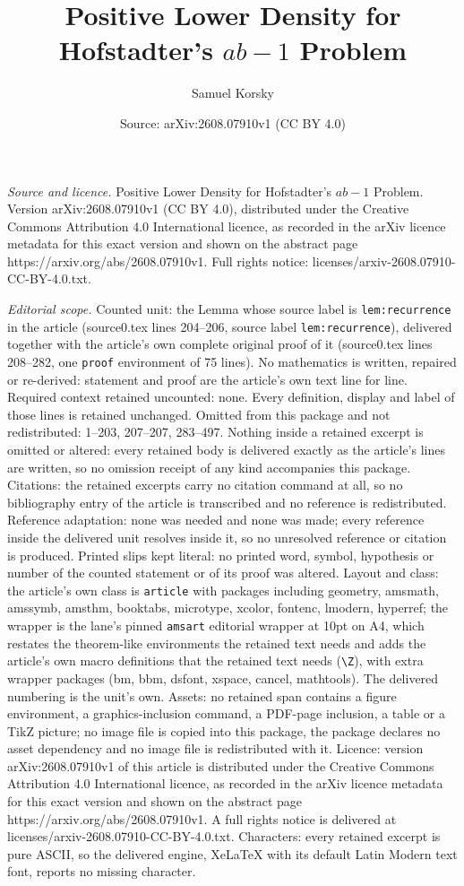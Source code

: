 \documentclass[10pt,a4paper]{amsart}
\title[Positive Lower Density for Hofstadter's $ab-1$ Problem]{Positive Lower Density for Hofstadter's $ab-1$ Problem}
\author{Samuel Korsky}
\date{Source: arXiv:2608.07910v1 (CC BY 4.0)}
\begin{document}
\maketitle

\noindent\emph{Source and licence.} Positive Lower Density for Hofstadter's $ab-1$ Problem. Version arXiv:2608.07910v1 (CC BY 4.0), distributed under the Creative Commons Attribution 4.0 International licence, as recorded in the arXiv licence metadata for this exact version and shown on the abstract page https://arxiv.org/abs/2608.07910v1. Full rights notice: licenses/arxiv-2608.07910-CC-BY-4.0.txt.\par\smallskip

\noindent\textit{Editorial scope.} Counted unit: the Lemma whose source label is \texttt{lem:recurrence} in the article (source0.tex lines 204--206, source label \texttt{lem:recurrence}), delivered together with the article's own complete original proof of it (source0.tex lines 208--282, one \texttt{proof} environment of 75 lines). No mathematics is written, repaired or re-derived: statement and proof are the article's own text line for line. Required context retained uncounted: none. Every definition, display and label of those lines is retained unchanged. Omitted from this package and not redistributed: 1--203, 207--207, 283--497. Nothing inside a retained excerpt is omitted or altered: every retained body is delivered exactly as the article's lines are written, so no omission receipt of any kind accompanies this package. Citations: the retained excerpts carry no citation command at all, so no bibliography entry of the article is transcribed and no reference is redistributed. Reference adaptation: none was needed and none was made; every reference inside the delivered unit resolves inside it, so no unresolved reference or citation is produced. Printed slips kept literal: no printed word, symbol, hypothesis or number of the counted statement or of its proof was altered. Layout and class: the article's own class is \texttt{article} with packages including geometry, amsmath, amssymb, amsthm, booktabs, microtype, xcolor, fontenc, lmodern, hyperref; the wrapper is the lane's pinned \texttt{amsart} editorial wrapper at 10pt on A4, which restates the theorem-like environments the retained text needs and adds the article's own macro definitions that the retained text needs (\texttt{\textbackslash Z}), with extra wrapper packages (bm, bbm, dsfont, xspace, cancel, mathtools). The delivered numbering is the unit's own. Assets: no retained span contains a figure environment, a graphics-inclusion command, a PDF-page inclusion, a table or a TikZ picture; no image file is copied into this package, the package declares no asset dependency and no image file is redistributed with it. Licence: version arXiv:2608.07910v1 of this article is distributed under the Creative Commons Attribution 4.0 International licence, as recorded in the arXiv licence metadata for this exact version and shown on the abstract page https://arxiv.org/abs/2608.07910v1. A full rights notice is delivered at licenses/arxiv-2608.07910-CC-BY-4.0.txt. Characters: every retained excerpt is pure ASCII, so the delivered engine, XeLaTeX with its default Latin Modern text font, reports no missing character.
\end{document}
